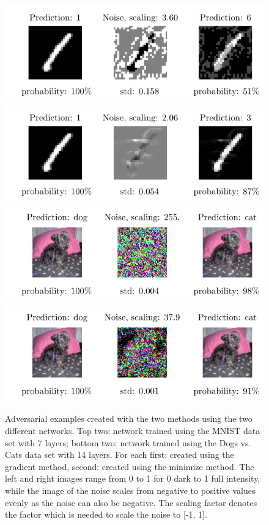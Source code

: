 \documentclass[%
 reprint,
 amsmath,amssymb,
 aps,
]{revtex4-1}
\begin{document}
\begin{figure}
\centering
\showthe\columnwidth
\includegraphics[width = 1\linewidth]{figures/mnist_model2_I0_f0277.pdf}
\includegraphics[width = 1\linewidth]{figures/adv_example_minimizer_mnist_0.pdf}
\includegraphics[width = 1\linewidth]{figures/cvd_model9_I0_f0003.pdf}
\includegraphics[width = 1\linewidth]{figures/adv_example_minimizer_dogs_vs_cats_0.pdf}
\caption{Adversarial examples created with the two methods using the two different networks. Top two: network trained using the MNIST data set with 7 layers; bottom two: network trained using the Dogs vs. Cats data set with 14 layers. For each first: created using the gradient method, second: created using the minimize method. The left and right images range from 0 to 1 for 0 dark to 1 full intensity, while the image of the noise scales from negative to positive values evenly as the noise can also be negative. The scaling factor denotes the factor which is needed to scale the noise to [-1, 1].}
\label{fig:examples}
\end{figure}
\end{document}
